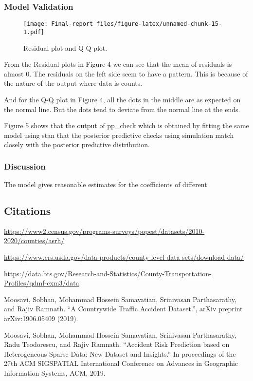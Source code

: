\documentclass[
]{article}
\begin{document}
\hypertarget{model-validation}{%
\subsubsection{Model Validation}\label{model-validation}}

\begin{figure}
\centering
\texttt{[image: Final-report\_files/figure-latex/unnamed-chunk-15-1.pdf]}
\caption{Residual plot and Q-Q plot.}
\end{figure}

From the Residual plots in Figure 4 we can see that the mean of
residuals is almost 0. The residuals on the left side seem to have a
pattern. This is because of the nature of the output where data is
counts.

And for the Q-Q plot in Figure 4, all the dots in the middle are as
expected on the normal line. But the dots tend to deviate from the
normal line at the ends.

Figure 5 shows that the output of pp\_check which is obtained by fitting
the same model using stan that the posterior predictive checks using
simulation match closely with the posterior predictive distribution.

\hypertarget{discussion}{%
\subsubsection{Discussion}\label{discussion}}

The model gives reasonable estimates for the coefficients of different

\hypertarget{citations}{%
\subsection{Citations}\label{citations}}

\url{https://www2.census.gov/programs-surveys/popest/datasets/2010-2020/counties/asrh/}

\url{https://www.ers.usda.gov/data-products/county-level-data-sets/download-data/}

\url{https://data.bts.gov/Research-and-Statistics/County-Transportation-Profiles/qdmf-cxm3/data}

Moosavi, Sobhan, Mohammad Hossein Samavatian, Srinivasan Parthasarathy,
and Rajiv Ramnath. ``A Countrywide Traffic Accident Dataset.'', arXiv
preprint arXiv:1906.05409 (2019).

Moosavi, Sobhan, Mohammad Hossein Samavatian, Srinivasan Parthasarathy,
Radu Teodorescu, and Rajiv Ramnath. ``Accident Risk Prediction based on
Heterogeneous Sparse Data: New Dataset and Insights.'' In proceedings of
the 27th ACM SIGSPATIAL International Conference on Advances in
Geographic Information Systems, ACM, 2019.
\end{document}
